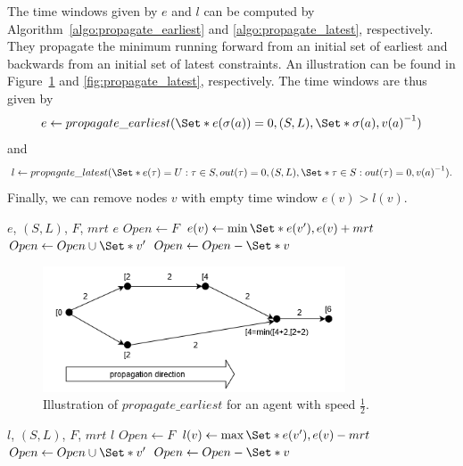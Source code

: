 \documentclass{article}
\begin{document}
The time windows given by $e$ and $l$ can be computed by Algorithm~\ref{algo:propagate_earliest} and \ref{algo:propagate_latest}, respectively. They propagate the minimum running forward from an initial set of earliest and backwards from an initial set of latest constraints. An illustration can be found in Figure~\ref{fig:propagate_earliest} and \ref{fig:propagate_latest}, respectively.
The time windows are thus given by
$$e\leftarrow propagate\_earliest(\Set*{e(\sigma(a))=0}, (S,L), \Set*{\sigma(a)}, {v(a)}^{-1})$$ and $$l\leftarrow propagate\_latest(\Set*{e(\tau)=U: \tau \in S, out(\tau)=0}, (S,L), \Set*{\tau \in S: out(\tau)=0},{v(a)}^{-1}).$$
Finally, we can remove nodes $v$ with empty time window $e(v)>l(v)$.





\begin{algorithm}
	\caption{$propagate\_earliest$} \label{algo:propagate_earliest}
	\begin{algorithmic}[1]
	    \Require $e$, $(S,L)$, $F$, $mrt$
	    \Ensure $e$
	    \State $Open \leftarrow F$
    			\State $e(v) \leftarrow \min \Set*{e(v^\prime), e(v)+mrt}$
    			\State $Open \leftarrow Open \cup \Set*{v^\prime}$
    		\EndFor
			\State $Open \leftarrow Open - \Set*{v}$
		\EndFor
	\end{algorithmic}
\end{algorithm}

\begin{figure}[hbtp]
	\centering
  \includegraphics[width=0.8\textwidth]{H1_propagate_earliest.png}
	\caption{Illustration of $propagate\_earliest$ for an agent with speed $\frac{1}{2}$.}
	\label{fig:propagate_earliest}
\end{figure}


\begin{algorithm}
	\caption{$propagate\_latest$} \label{algo:propagate_latest}
	\begin{algorithmic}[1]
	    \Require $l$, $(S,L)$, $F$, $mrt$
	    \Ensure $l$
	    \State $Open \leftarrow F$
    			\State $l(v) \leftarrow \max \Set*{e(v^\prime), e(v)-mrt}$
    			\State $Open \leftarrow Open \cup \Set*{v^\prime}$
    		\EndFor
			\State $Open \leftarrow Open - \Set*{v}$
		\EndFor
	\end{algorithmic}
\end{algorithm}
\end{document}
